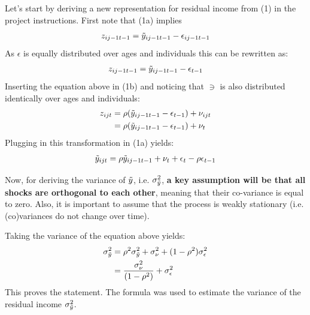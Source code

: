 \documentclass[12pt,a4paper]{article}
\begin{document}
Let's start by deriving a new representation for residual income from (1) in the project instructions. First note that (1a) implies
\begin{align}
    z_{ij-1t-1} = \Tilde{y}_{ij-1t-1} - \epsilon_{ij-1t-1}
\end{align}
As $\epsilon$ is equally distributed over ages and individuals this can be rewritten as:
\begin{align}
    z_{ij-1t-1} = \Tilde{y}_{ij-1t-1} - \epsilon_{t-1}
\end{align}
Inserting the equation above in (1b) and noticing that $\ni$ is also distributed identically over ages and individuals:
\begin{align}
    z_{ijt} & = \rho(\Tilde{y}_{ij-1t-1} - \epsilon_{t-1}) + \nu_{ijt} \\
            & = \rho(\Tilde{y}_{ij-1t-1} - \epsilon_{t-1}) + \nu_{t}
\end{align}
Plugging in this transformation in (1a) yields:
\begin{align}
    \Tilde{y}_{ijt} = \rho\Tilde{y}_{ij-1t-1}  + \nu_{t} + \epsilon_t - \rho \epsilon_{t-1}
\end{align}

Now, for deriving the variance of $\Tilde{y}$, i.e. $\sigma^2_{\Tilde{y}}$, \textbf{a key assumption will be that all shocks are orthogonal to each other}, meaning that their co-variance is equal to zero. Also, it is important to assume that the process is weakly stationary (i.e. (co)variances do not change over time). 

Taking the variance of the equation above yields:
\begin{align}
    \sigma^2_{\Tilde{y}} & = \rho^2 \sigma^2_{\Tilde{y}} + \sigma^2_\nu + (1-\rho^2)\sigma^2_\epsilon \\
                         & = \frac{\sigma^2_\nu}{(1-\rho^2)} + \sigma^2_\epsilon
\end{align}
This proves the statement. The formula was used to estimate the variance of the residual income $\sigma^2_{\Tilde{y}}$.
\end{document}
